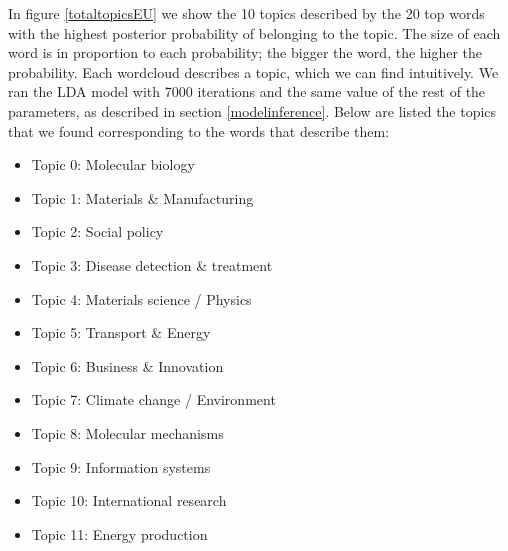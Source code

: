 \documentclass[12pt]{report}
\begin{document}
In figure \ref{totaltopicsEU} we show the 10 topics described by
the 20 top words with the highest posterior probability of belonging
to the topic. The size of each word is in proportion to each
probability; the bigger the word, the higher the probability. Each
wordcloud describes a topic, which we can find intuitively. 
We ran the LDA model with 7000
iterations and the same value of the rest of the
parameters, as described in section \ref{modelinference}. Below are
listed the topics that we found corresponding to the words that
describe them:
\begin{itemize}
\item[] Topic 0: Molecular biology
\item[] Topic 1: Materials \& Manufacturing
\item[] Topic 2: Social policy
\item[] Topic 3: Disease detection \& treatment
\item[] Topic 4: Materials science / Physics
\item[] Topic 5: Transport \& Energy
\item[] Topic 6: Business \& Innovation
\item[] Topic 7: Climate change / Environment
\item[] Topic 8: Molecular mechanisms
\item[] Topic 9: Information systems
\item[] Topic 10: International research
\item[] Topic 11: Energy production
\end{itemize}
\end{document}
